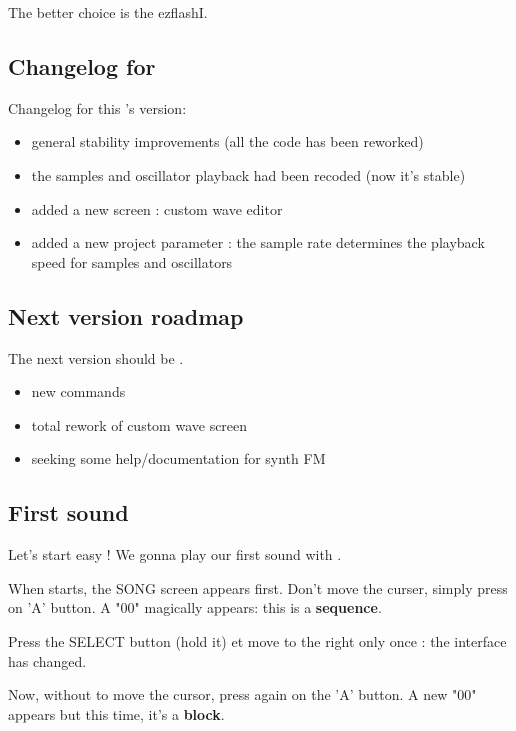 \medskip The better choice is the ezflashI.

\subsection{Changelog for \fatversion}

Changelog for this \FAT's version: \medskip
\begin{itemize}
  \item{general stability improvements (all the code has been reworked)}
  \item{the samples and oscillator playback had been recoded (now it's stable)}
  \item{added a new screen : custom wave editor}
  \item{added a new project parameter : the sample rate determines the playback speed for samples and oscillators}
\end{itemize}

\subsection{Next version roadmap}

The next version should be \fatnextversion. \medskip
\begin{itemize}
    \item{new commands}
    \item{total rework of custom wave screen}
    \item{seeking some help/documentation for synth FM}
\end{itemize}

\subsection{First sound}

Let's start easy ! We gonna play our first sound with \FAT.\medskip

When \FAT starts, the SONG screen appears first. Don't move the curser, simply press on 'A' button.
A "00" magically appears: this is a {\bf sequence}.


Press the SELECT button (hold it) et move to the right only once : the interface has changed.


Now, without to move the cursor, press again on the 'A' button. A new "00" appears but this time, it's a {\bf block}.

